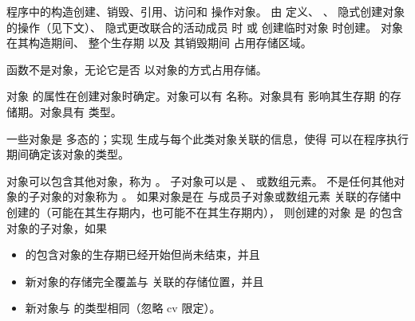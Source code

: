 \pnum
{}%
\Cpp{} 程序中的构造创建、销毁、引用、访问和
操作对象。
 由
定义、
、
隐式创建对象的操作（见下文）、
隐式更改联合的活动成员 时
或
创建临时对象 时创建。
对象在其构造期间、
整个生存期
以及
其销毁期间 占用存储区域。
\begin{note}
函数不是对象，无论它是否
以对象的方式占用存储。
\end{note}
对象
的属性在创建对象时确定。对象可以有
名称。对象具有
影响其生存期 的存储期。对象具有
类型。
\begin{note}
一些对象是
多态的；实现
生成与每个此类对象关联的信息，使得
可以在程序执行期间确定该对象的类型。
\end{note}

\pnum
{}%
对象可以包含其他对象，称为 。
子对象可以是
、
或数组元素。
%
不是任何其他对象的子对象的对象称为 。
如果对象是在
与成员子对象或数组元素 
关联的存储中创建的（可能在其生存期内，也可能不在其生存期内），
则创建的对象
是  的包含对象的子对象，如果
\begin{itemize}
\item
{} 的包含对象的生存期已经开始但尚未结束，并且
\item
新对象的存储完全覆盖与  关联的存储位置，并且
\item
新对象与  的类型相同（忽略 cv 限定）。
\end{itemize}

